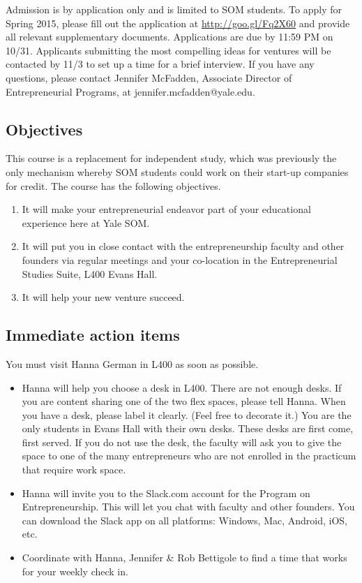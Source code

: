 Admission is by application only and is limited to SOM students. To apply for Spring 2015, please fill out the application at \url{http://goo.gl/Fq2X60} and provide all relevant supplementary
 documents. Applications are due by 11:59 PM on 10/31. Applicants submitting the most compelling ideas for ventures will be contacted by 11/3 to set up a time for a brief interview. If you have any questions, please contact Jennifer McFadden, Associate Director
 of Entrepreneurial Programs, at jennifer.mcfadden@yale.edu. 

\subsection*{Objectives}
This course is a replacement for independent study, which was previously the only mechanism
whereby SOM students could work on their start-up companies for credit. The course has the
following objectives.
\begin{enumerate}
	\item
		It will make your entrepreneurial endeavor part of your
		educational experience here at Yale SOM.
	\item
		It will put you in close contact with the entrepreneurship
		faculty and other founders via regular meetings and your
		co-location in the Entrepreneurial Studies Suite, L400 Evans Hall.
	\item
		It will help your new venture succeed.
\end{enumerate}

\subsection*{Immediate action items}
You must visit Hanna German in L400 as soon as possible.

\begin{itemize}
	
		\item
		Hanna will help you choose a desk in L400. There are not enough
		desks. If you are content sharing one of the two flex spaces,
		please tell Hanna. When you have a desk, please label it
		clearly. (Feel free to decorate it.) You are the only students
		in Evans Hall with their own desks. These desks are first come, first
		served. If you do not use the desk, the faculty will ask you to give
		the space to one of the many entrepreneurs who are not enrolled in the
		practicum that require work space.
	
	\item Hanna will invite you to the Slack.com account for the Program on Entrepreneurship.
		This will let you 
		chat with faculty and other founders. You can download the Slack app
		on all platforms: Windows, Mac, Android, iOS, etc.
		
	\item Coordinate with Hanna, Jennifer & Rob Bettigole to find a time that works for your weekly check in.
\end{itemize}


